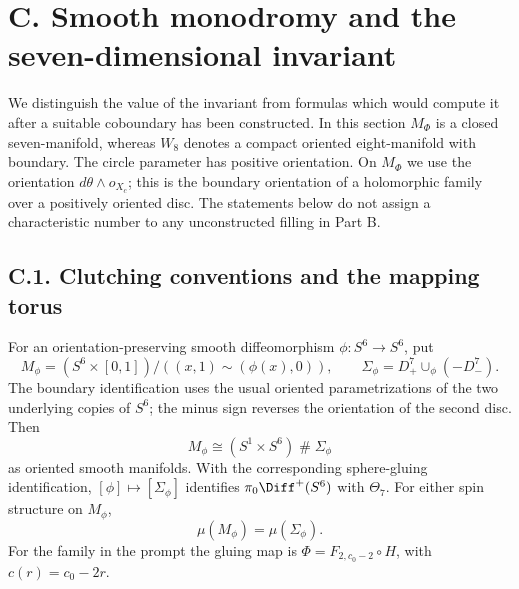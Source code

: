 \section{C. Smooth monodromy and the seven-dimensional invariant}

We distinguish the value of the invariant from formulas which would
compute it after a suitable coboundary has been constructed. In this
section $M_\Phi$ is a closed seven-manifold, whereas $W_8$ denotes a
compact oriented eight-manifold with boundary. The circle parameter
has positive orientation. On $M_\Phi$ we use the orientation
$d\theta\wedge o_{X_c}$; this is the boundary orientation of a
holomorphic family over a positively oriented disc. The statements
below do not assign a characteristic number to any unconstructed
filling in Part B.

\subsection{C.1. Clutching conventions and the mapping torus}

\begin{proposition}
For an orientation-preserving smooth diffeomorphism
$\phi:S^6\to S^6$, put
\[
 M_\phi=(S^6\times[0,1])/((x,1)\sim(\phi(x),0)),\qquad
 \Sigma_\phi=D^7_+\cup_\phi(-D^7_-).
\]
The boundary identification uses the usual oriented parametrizations
of the two underlying copies of $S^6$; the minus sign reverses the
orientation of the second disc. Then
\[
 M_\phi\cong (S^1\times S^6)\mathbin\#\Sigma_\phi
\]
as oriented smooth manifolds. With the corresponding sphere-gluing
identification, $[\phi]\mapsto[\Sigma_\phi]$ identifies
$\pi_0\Diff^+(S^6)$ with $\Theta_7$. For either spin structure on
$M_\phi$,
\[
 \mu(M_\phi)=\mu(\Sigma_\phi).
\]
For the family in the prompt the gluing map is
$\Phi=F_{2,c_0-2}\circ H$, with $c(r)=c_0-2r$.
\end{proposition}

